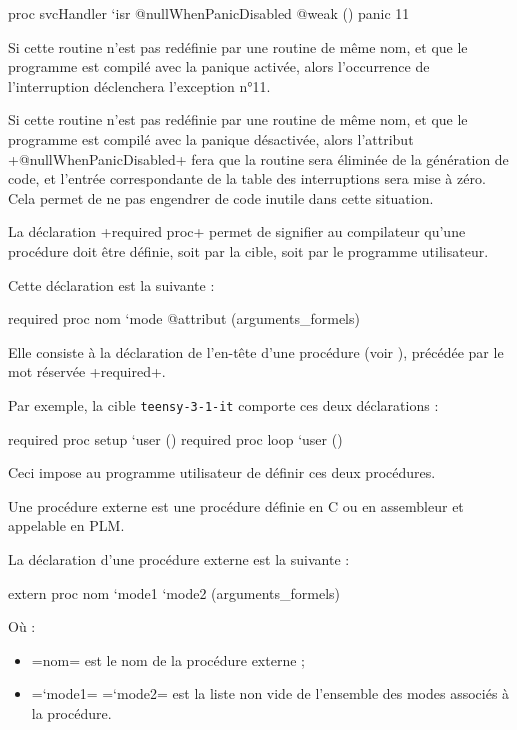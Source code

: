 \begin{PLM}
proc svcHandler `isr @nullWhenPanicDisabled @weak () {
  panic 11
}
\end{PLM}

Si cette routine n'est pas redéfinie par une routine de même nom, et que le programme est compilé avec la panique activée, alors l'occurrence de l'interruption déclenchera l'exception n°11.

Si cette routine n'est pas redéfinie par une routine de même nom, et que le programme est compilé avec la panique désactivée, alors l'attribut \plm+@nullWhenPanicDisabled+ fera que la routine sera éliminée de la génération de code, et l'entrée correspondante de la table des interruptions sera mise à zéro. Cela permet de ne pas engendrer de code inutile dans cette situation.

 






La déclaration \plm+required proc+ permet de signifier au compilateur qu'une procédure doit être définie, soit par la cible, soit par le programme utilisateur.

Cette déclaration est la suivante :
\begin{PLM}
required proc nom `mode @attribut (arguments_formels)
\end{PLM}

Elle consiste à la déclaration de l'en-tête d'une procédure (voir ), précédée par le mot réservée \plm+required+.

Par exemple, la cible \texttt{teensy-3-1-it} comporte ces deux déclarations :

\begin{PLM}
required proc setup `user ()
required proc loop `user ()
\end{PLM}

Ceci impose au programme utilisateur de définir ces deux procédures.








Une procédure externe est une procédure définie en C ou en assembleur et appelable en PLM.

La déclaration d'une procédure externe est la suivante :
\begin{PLM}
extern proc nom `mode1 `mode2 (arguments_formels)
\end{PLM}
Où :
\begin{itemize}
  \item \plm=nom= est le nom de la procédure externe ;
  \item \plm=`mode1= \plm=`mode2= est la liste non vide de l'ensemble des modes associés à la procédure.
\end{itemize}













